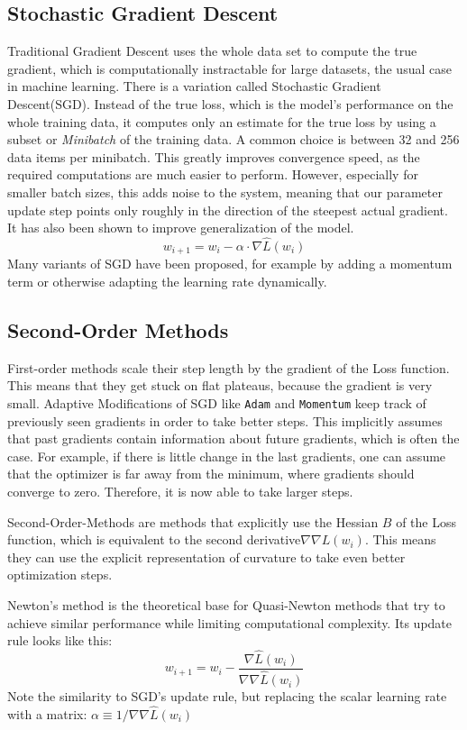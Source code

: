 \documentclass[twoside,12pt,a4paper]{report}
\begin{document}
\subsection{Stochastic Gradient Descent}
Traditional Gradient Descent uses the whole data set to compute the true gradient, which is computationally instractable for large datasets, the usual case in machine learning. There is a variation called Stochastic Gradient Descent(SGD). Instead of the true loss, which is the model's performance on the whole training data, it computes only an estimate for the true loss by using a subset or \textit{Minibatch} of the training data. A common choice is between 32 and 256 data items per minibatch.
This greatly improves convergence speed, as the required computations are much easier to perform. However, especially for smaller batch sizes, this adds noise to the system, meaning that our parameter update step points only roughly in the direction of the steepest actual gradient. It has also been shown to improve generalization of the model.
$$w_{i+1} = w_i - \alpha \cdot \nabla \hat{L}(w_i) $$
Many variants of SGD have been proposed, for example by adding a  momentum term or otherwise adapting the learning rate dynamically.

\subsection{Second-Order Methods}
First-order methods scale their step length by the gradient of the Loss function. This means that they get stuck on flat plateaus, because the gradient is very small.
Adaptive Modifications of SGD like \verb|Adam| and \verb|Momentum| keep track of previously seen gradients in order to take better steps. This implicitly assumes that past gradients contain information about future gradients, which is often the case.
For example, if there is little change in the last gradients, one can assume that the optimizer is far away from the minimum, where gradients should converge to zero. Therefore, it is now able to take larger steps.

Second-Order-Methods are methods that explicitly use the Hessian $B$ of the Loss function, which is equivalent to the second derivative$\nabla\nabla{L}(w_i)$. This means they can use the explicit representation of curvature to take even better optimization steps.

Newton's method is the theoretical base for Quasi-Newton methods that try to achieve similar performance while limiting computational complexity. Its update rule looks like this:
$$w_{i+1} = w_i - \frac{\nabla \hat{L}(w_i)}{\nabla\nabla\hat{L}(w_i)}$$
Note the similarity to SGD's update rule, but replacing the scalar learning rate with a matrix: $\alpha \equiv 1 / \nabla\nabla\hat{L}(w_i)$
\end{document}
